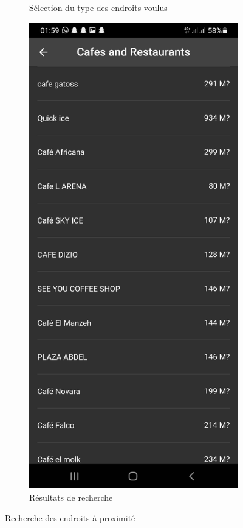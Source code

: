 \begin{figure}[!htbp]
\begin{subfigure}{.45\linewidth}
         \caption{Sélection du type des endroits voulus}
    \end{subfigure} 
    \hfill
    \begin{subfigure}{.45\linewidth}
        \centering
         \includegraphics[width=\textwidth]{assets/app/explore/result.jpg}
         \caption{Résultats de recherche}
    \end{subfigure}
    \caption{Recherche des endroits à proximité}
\end{figure}

